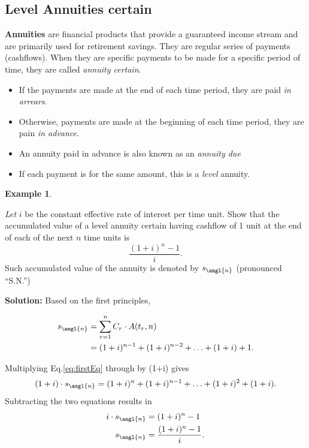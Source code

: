 \documentclass[
]{book}
\theoremstyle{definition}
\theoremstyle{definition}
\newtheorem{example}{Example}[chapter]
\theoremstyle{definition}
\theoremstyle{definition}
\theoremstyle{remark}
\begin{document}
\hypertarget{level-annuities-certain}{%
\subsection{Level Annuities certain}\label{level-annuities-certain}}

\textbf{Annuities} are financial products that provide a guaranteed income
stream and are primarily used for retirement savings. They are regular
series of payments (cashflows). When they are specific payments to be
made for a specific period of time, they are called \emph{annuity certain}.

\begin{itemize}
\item
  If the payments are made at the end of each time period, they are
  paid \emph{in arrears}.
\item
  Otherwise, payments are made at the beginning of each time period,
  they are pain \emph{in advance}.
\item
  An annuity paid in advance is also known as an \emph{annuity due}
\item
  If each payment is for the same amount, this is a \emph{level} annuity.
\end{itemize}

\begin{example}
\protect\hypertarget{exm:unlabeled-div-25}{}\label{exm:unlabeled-div-25}

\emph{Let} \(i\) be the constant effective rate of interest per time unit. Show
that the accumulated value of a level annuity certain having cashflow of
1 unit at the end of each of the next \(n\) time units is
\[\frac{(1+i)^n -1 }{i}.\] Such accumulated value of the annuity is
denoted by \(s_\angl{n}\) (pronounced ``S.N.'')

\end{example}

\textbf{Solution:} Based on the first principles,

\begin{align} 
 s_\angl{n} &= \sum_{r=1}^n C_r \cdot A(t_r,n) \\
    &= (1+i)^{n-1} + (1+i)^{n-2} + \ldots + (1+i) + 1. \label{eq:firstEq} 
\end{align}

Multiplying Eq.\eqref{eq:firstEq} through by (1+i) gives \begin{equation}
    (1+i) \cdot s_\angl{n}  = (1+i)^{n} + (1+i)^{n-1} + \ldots + (1+i)^2 + (1+i). 
\end{equation} Subtracting the two equations results in
\[\begin{aligned}
    i \cdot s_\angl{n} &= (1+i)^{n} - 1\\
        s_\angl{n} &= \frac{(1+i)^{n} - 1}{i}.\end{aligned}\]
\end{document}
